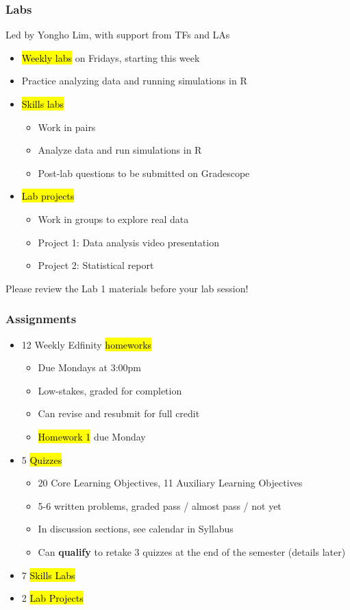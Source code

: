 \documentclass[slidestop,compress,mathserif]{beamer}
\begin{document}
\begin{frame}
	\frametitle{Labs} 
	Led by Yongho Lim, with support from TFs and LAs
	\begin{itemize}
		\item \hl{Weekly labs} on Fridays, starting this week
		\item Practice analyzing data and running simulations in R
		\item \hl{Skills labs}
		\begin{itemize}
			\item Work in pairs
			\item Analyze data and run simulations in R
			\item Post-lab questions to be submitted on Gradescope
		\end{itemize}
		\item \hl{Lab projects}
		\begin{itemize}
			\item Work in groups to explore real data
			\item Project 1: Data analysis video presentation
			\item Project 2: Statistical report
		\end{itemize}
	\end{itemize}
	Please review the Lab 1 materials before your lab session!
\end{frame}


\begin{frame}
	\frametitle{Assignments}
	\begin{itemize}
		\item 12 Weekly Edfinity \hl{homeworks}
		\begin{itemize}
			\item Due Mondays at 3:00pm
			\item Low-stakes, graded for completion
			\item Can revise and resubmit for full credit
			\item \hl{Homework 1} due Monday
		\end{itemize} 
		\item 5 \hl{Quizzes} 
		\begin{itemize}
			\item 20 Core Learning Objectives, 11 Auxiliary Learning Objectives
			\item 5-6 written problems, graded pass / almost pass / not yet
			\item In discussion sections, see calendar in Syllabus
			\item Can \textbf{qualify} to retake 3 quizzes at the end of the semester (details later)
		\end{itemize}
		\item 7 \hl{Skills Labs}
		\item 2 \hl{Lab Projects}
	\end{itemize}
\end{frame}
\end{document}
